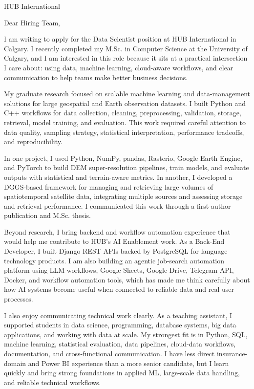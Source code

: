 \documentclass[11pt]{letter}
\begin{document}
\begin{letter}{HUB International}

\opening{Dear Hiring Team,}

I am writing to apply for the Data Scientist position at HUB International in Calgary. I recently completed my M.Sc. in Computer Science at the University of Calgary, and I am interested in this role because it sits at a practical intersection I care about: using data, machine learning, cloud-aware workflows, and clear communication to help teams make better business decisions.

My graduate research focused on scalable machine learning and data-management solutions for large geospatial and Earth observation datasets. I built Python and C++ workflows for data collection, cleaning, preprocessing, validation, storage, retrieval, model training, and evaluation. This work required careful attention to data quality, sampling strategy, statistical interpretation, performance tradeoffs, and reproducibility.

In one project, I used Python, NumPy, pandas, Rasterio, Google Earth Engine, and PyTorch to build DEM super-resolution pipelines, train models, and evaluate outputs with statistical and terrain-aware metrics. In another, I developed a DGGS-based framework for managing and retrieving large volumes of spatiotemporal satellite data, integrating multiple sources and assessing storage and retrieval performance. I communicated this work through a first-author publication and M.Sc. thesis.

Beyond research, I bring backend and workflow automation experience that would help me contribute to HUB's AI Enablement work. As a Back-End Developer, I built Django REST APIs backed by PostgreSQL for language technology products. I am also building an agentic job-search automation platform using LLM workflows, Google Sheets, Google Drive, Telegram API, Docker, and workflow automation tools, which has made me think carefully about how AI systems become useful when connected to reliable data and real user processes.

I also enjoy communicating technical work clearly. As a teaching assistant, I supported students in data science, programming, database systems, big data applications, and working with data at scale. My strongest fit is in Python, SQL, machine learning, statistical evaluation, data pipelines, cloud-data workflows, documentation, and cross-functional communication. I have less direct insurance-domain and Power BI experience than a more senior candidate, but I learn quickly and bring strong foundations in applied ML, large-scale data handling, and reliable technical workflows.


\end{letter}
\end{document}
